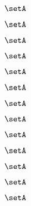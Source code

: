 \begin{forslides}
    \begin{equation}
        \label{eq:slides-processes-80}
        \setA
    \end{equation}

    \begin{equation}
        \label{eq:slides-processes-81}
        \setA
    \end{equation}

    \begin{equation}
        \label{eq:slides-processes-82}
        \setA
    \end{equation}

    \begin{equation}
        \label{eq:slides-processes-83}
        \setA
    \end{equation}

    \begin{equation}
        \label{eq:slides-processes-84}
        \setA
    \end{equation}

    \begin{equation}
        \label{eq:slides-processes-85}
        \setA
    \end{equation}

    \begin{equation}
        \label{eq:slides-processes-86}
        \setA
    \end{equation}

    \begin{equation}
        \label{eq:slides-processes-87}
        \setA
    \end{equation}

    \begin{equation}
        \label{eq:slides-processes-88}
        \setA
    \end{equation}

    \begin{equation}
        \label{eq:slides-processes-89}
        \setA
    \end{equation}

    \begin{equation}
        \label{eq:slides-processes-90}
        \setA
    \end{equation}

    \begin{equation}
        \label{eq:slides-processes-91}
        \setA
    \end{equation}

    \begin{equation}
        \label{eq:slides-processes-92}
        \setA
    \end{equation}


\end{forslides}
